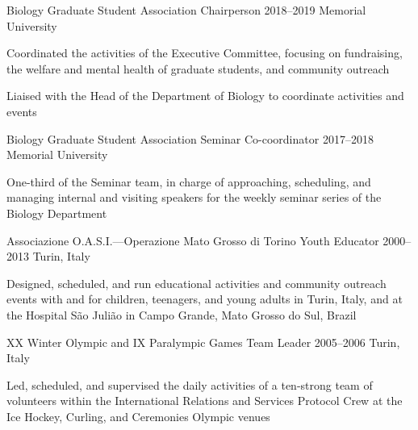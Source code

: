 \begin{cventries}
  \cventry
    {Biology Graduate Student Association} %
    {Chairperson} %
    {2018--2019} %
    {Memorial University} %
    {
      \begin{cvitems} %
        \item {Coordinated the activities of the Executive Committee, focusing on fundraising, the welfare and mental health of graduate students, and community outreach}
        \item {Liaised with the Head of the Department of Biology to coordinate activities and events}
      \end{cvitems}
    }

  \cventry
    {Biology Graduate Student Association} %
    {Seminar Co-coordinator} %
    {2017--2018} %
    {Memorial University} %
    {
      \begin{cvitems} %
        \item {One-third of the Seminar team, in charge of approaching, scheduling, and managing internal and visiting speakers for the weekly seminar series of the Biology Department}
      \end{cvitems}
    }

  \cventry
    {Associazione O.A.S.I.---Operazione Mato Grosso di Torino} %
    {Youth Educator} %
    {2000--2013} %
    {Turin, Italy} %
    {
      \begin{cvitems} %
        \item {Designed, scheduled, and run educational activities and community outreach events with and for children, teenagers, and young adults in Turin, Italy, and at the Hospital S{\~a}o Juli{\~a}o in Campo Grande, Mato Grosso do Sul, Brazil}
      \end{cvitems}
    }

\cventry
    {XX Winter Olympic and IX Paralympic Games} %
    {Team Leader} %
    {2005--2006} %
    {Turin, Italy} %
    {
      \begin{cvitems} %
        \item {Led, scheduled, and supervised the daily activities of a ten-strong team of volunteers within the International Relations and Services Protocol Crew at the Ice Hockey, Curling, and Ceremonies Olympic venues}
      \end{cvitems}
    }

\end{cventries}
